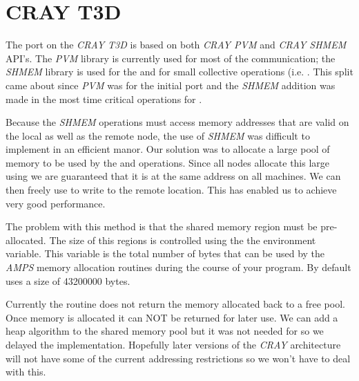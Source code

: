 
\section{CRAY T3D}
\label{CRAY T3D}

The port on the {\em CRAY T3D} is based on both {\em CRAY PVM} and {\em CRAY
SHMEM} API's.  The {\em PVM} library is currently used for most of the
communication; the {\em SHMEM} library is used for the
 and for small collective operations (i.e.
.  This split came about since {\em PVM} was for
the initial port and the {\em SHMEM} addition was made in the most
time critical operations for \parflow{}.  

Because the {\em SHMEM} operations must access memory addresses that
are valid on the local as well as the remote node, the use of {\em
SHMEM} was difficult to implement in an efficient manor.  Our solution
was to allocate a large pool of memory to be used by the
 and  operations.  Since all
nodes allocate this large using  we are guaranteed that
it is at the same address on all machines.  We can then freely use
 to write to the remote location.  This has enabled us
to achieve very good performance.

The problem with this method is that the shared memory region must be
pre-allocated.  The size of this regions is controlled using the the
 environment variable.  This variable is the
total number of bytes that can be used by the {\em AMPS} memory
allocation routines during the course of your program.  By default
\parflow{} uses a size of 43200000 bytes.  

Currently the  routine does not return the memory
allocated back to a free pool.  Once memory is allocated it can NOT be
returned for later use.  We can add a heap algorithm to the shared
memory pool but it was not needed for \parflow{} so we delayed the
implementation.  Hopefully later versions of the {\em CRAY} architecture will
not have some of the current addressing restrictions so we won't have
to deal with this.


